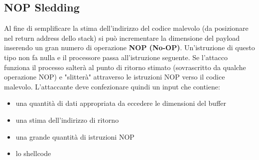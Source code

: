 \subsection{NOP Sledding}
Al fine di semplificare la stima dell'indirizzo del codice malevolo (da posizionare nel return address dello stack) si può incrementare la dimensione del payload inserendo un gran numero di operazione \textbf{NOP (No-OP)}. Un'istruzione di questo tipo non fa nulla e il processore passa all'istruzione seguente. Se l'attacco funziona il processo salterà al punto di ritorno stimato (sovrascritto da qualche operazione NOP) e "slitterà" attraverso le istruzioni NOP verso il codice malevolo. L'attaccante deve confezionare quindi un input che contiene:
\begin{itemize}
  \item una quantità di dati appropriata da eccedere le dimensioni del buffer
  \item una stima dell’indirizzo di ritorno
  \item una grande quantità di istruzioni NOP
  \item lo shellcode
\end{itemize}
